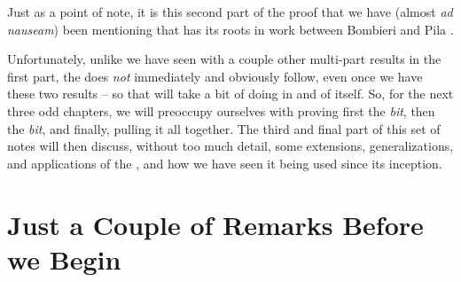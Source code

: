 Just as a point of note, it is this second part of the proof that we have (almost \textit{ad nauseam}) been mentioning that has its roots in work between Bombieri and Pila \cite{bombieri_number_1989}.

Unfortunately, unlike we have seen with a couple other multi-part results in the first part, the \pwt does \emph{not} immediately and obviously follow, even once we have these two results -- so that will take a bit of doing in and of itself. So, for the next three odd chapters, we will preoccupy ourselves with proving first the \emph{\om bit}, then the \emph{\nt bit}, and finally, pulling it all together. The third and final part of this set of notes will then discuss, without too much detail, some extensions, generalizations, and applications of the \pwt, and how we have seen it being used since its inception.

\section{Just a Couple of Remarks Before we Begin}

